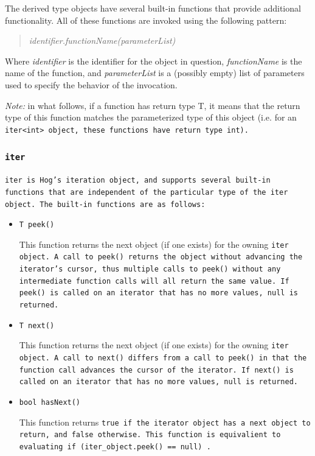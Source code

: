 \documentclass{article}
\begin{document}
The derived type objects have several built-in functions that provide additional functionality. All of these functions
are invoked using the following pattern:

\begin{quotation}
\emph{identifier.functionName(parameterList)}
\end{quotation}

\noindent Where \emph{identifier} is the identifier for the object in question, \emph{functionName} is the name of the
function, and \emph{parameterList} is a (possibly empty) list of parameters used to specify the behavior of the invocation.

\emph{Note:} in what follows, if a function has return type T, it means that the return type of this function matches the
parameterized type of this object (i.e. for an \tt iter<int> \rm object, these functions have return type \tt int\rm).

\subsubsection{\tt iter \rm} %
\label{ssub:iter}

\tt iter \rm is Hog's iteration object, and supports several built-in functions
that are independent of the particular type of the \tt iter \rm object. The built-in functions are as follows:

\begin{itemize}

\item[] \tt T peek() \rm

This function returns the next object (if one exists) for the owning \tt iter \rm
object. A call to \tt peek() \rm returns the object without advancing the iterator's
cursor, thus multiple calls to \tt peek() \rm without any intermediate function calls
will all return the same value. If \tt peek() \rm is called on an iterator that has
no more values, \tt null \rm is returned. 

\item[] \tt T next() \rm

This function returns the next object (if one exists) for the owning \tt iter \rm
object. A call to \tt next() \rm differs from a call to \tt peek() \rm in that the
function call advances the cursor of the iterator. If \tt next() \rm is called on
an iterator that has no more values, \tt null \rm is returned. 

\item[] \tt bool hasNext() \rm

This function returns \tt true \rm if the iterator object has a next object
to return, and \tt false \rm otherwise. This function is equivalient to evaluating
\tt if (iter\_object.peek() == null) \rm.

\end{itemize} 
\end{document}
